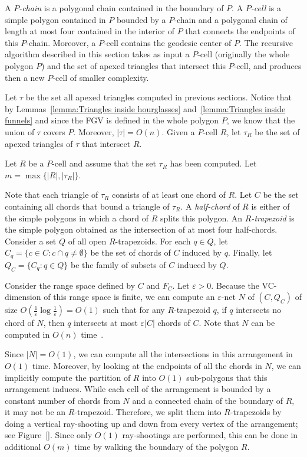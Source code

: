 \documentclass[a4paper,UKenglish]{lipics}
\begin{document}
A \emph{$P$-chain} is a polygonal chain contained in the boundary of $P$.
A \emph{$P$-cell} is a simple polygon contained in $P$ bounded by a $P$-chain and a polygonal chain of length at most four contained in the interior of $P$ that connects the endpoints of this $P$-chain. Moreover, a $P$-cell contains the geodesic center of $P$.
The recursive algorithm described in this section takes as input a $P$-cell (originally the whole polygon $P$) and the set of apexed triangles that intersect this $P$-cell, and produces then a new $P$-cell of smaller complexity.

Let $\tau$ be the set all apexed triangles computed in previous sections. Notice that by Lemmas~\ref{lemma:Triangles inside hourglasses} and~\ref{lemma:Triangles inside funnels} and since the FGV is defined in the whole polygon $P$, we know that the union of $\tau$ covers $P$. Moreover, $|\tau| = O(n)$.
Given a $P$-cell $R$, let $\tau_R$ be the set of apexed triangles of $\tau$ that intersect $R$.

Let $R$ be a $P$-cell and assume that the set $\tau_R$ has been computed.
Let $m = \max\{|R|, |\tau_R|\}$.

Note that each triangle of $\tau_R$ consists of at least one chord of $R$.
Let $C$ be the set containing all chords that bound a triangle of $\tau_R$. 
A \emph{half-chord} of $R$ is either of the simple polygons in which a chord of $R$ splits this polygon.
An \emph{$R$-trapezoid} is the simple polygon obtained as the intersection of at most four half-chords.
Consider a set $Q$ of all open $R$-trapezoids. 
For each $q\in Q$, let $C_q = \{c\in C: c\cap q \neq \emptyset\}$ be the set of chords of $C$ induced by $q$. 
Finally, let $Q_C = \{C_q : q\in Q\}$ be the family of subsets of $C$ induced by $Q$.

Consider the range space defined by $C$ and $F_C$. 
Let $\varepsilon >0$.
Because the VC-dimension of this range space is finite, we can compute an $\varepsilon$-net $N$ of $(C, Q_C)$ of size $O(\frac{1}{\varepsilon} \log \frac{1}{\varepsilon}) = O(1)$ such that for any $R$-trapezoid $q$, if $q$ intersects no chord of $N$, then $q$ intersects at most $\varepsilon |C|$ chords of $C$. Note that $N$ can be computed in $O(n)$ time~\cite{ConstructionEpsilonNets}. 

Since $|N| = O(1)$, we can compute all the intersections in this arrangement in $O(1)$ time. 
Moreover, by looking at the endpoints of all the chords in $N$, 
we can implicitly compute the partition of $R$ into $O(1)$ sub-polygons that this arrangement induces.
While each cell of the arrangement is bounded by a constant number of chords from $N$ and a connected chain of the boundary of $R$, it may not be an $R$-trapezoid. Therefore, we split them into $R$-trapezoids by doing a vertical ray-shooting up and down from every vertex of the arrangement; see Figure~\ref{}. 
Since only $O(1)$ ray-shootings are performed, this can be done in additional $O(m)$ time by walking the boundary of the polygon $R$.
\end{document}
